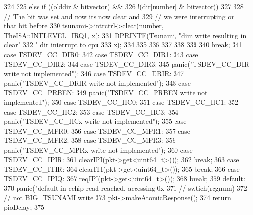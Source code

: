 \begin{DoxyCode}
{{{{{{324                         }
325                         else if ((olddir & bitvector) &&
326                                 !(dir[number] & bitvector))
327                         {
328                             // The bit was set and now its now clear and
329                             // we were interrupting on that bit before
330                             tsunami->intrctrl->clear(number, 
      TheISA::INTLEVEL_IRQ1, x);
331                           DPRINTF(Tsunami, "dim write resulting in clear"
332                                     " dir interrupt to cpu %
333                                     x);
334 
335                         }
336 
337 
338                     }
339                 }
340                 break;
341             case TSDEV_CC_DIR0:
342             case TSDEV_CC_DIR1:
343             case TSDEV_CC_DIR2:
344             case TSDEV_CC_DIR3:
345                 panic("TSDEV_CC_DIR write not implemented\n");
346             case TSDEV_CC_DRIR:
347                 panic("TSDEV_CC_DRIR write not implemented\n");
348             case TSDEV_CC_PRBEN:
349                 panic("TSDEV_CC_PRBEN write not implemented\n");
350             case TSDEV_CC_IIC0:
351             case TSDEV_CC_IIC1:
352             case TSDEV_CC_IIC2:
353             case TSDEV_CC_IIC3:
354                 panic("TSDEV_CC_IICx write not implemented\n");
355             case TSDEV_CC_MPR0:
356             case TSDEV_CC_MPR1:
357             case TSDEV_CC_MPR2:
358             case TSDEV_CC_MPR3:
359                 panic("TSDEV_CC_MPRx write not implemented\n");
360             case TSDEV_CC_IPIR:
361                 clearIPI(pkt->get<uint64_t>());
362                 break;
363             case TSDEV_CC_ITIR:
364                 clearITI(pkt->get<uint64_t>());
365                 break;
366             case TSDEV_CC_IPIQ:
367                 reqIPI(pkt->get<uint64_t>());
368                 break;
369             default:
370               panic("default in cchip read reached, accessing 0x%
371         }  // swtich(regnum)
372     } // not BIG_TSUNAMI write
373     pkt->makeAtomicResponse();
374     return pioDelay;
375 }
\end{DoxyCode}


